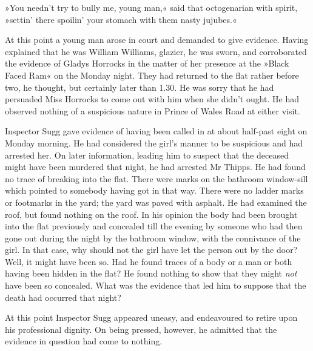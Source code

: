»You needn't try to bully me, young man,« said that octogenarian with spirit, »settin' there spoilin' your stomach with them nasty jujubes.«

At this point a young man arose in court and demanded to give evidence. Having explained that he was William Williams, glazier, he was sworn, and corroborated the evidence of Gladys Horrocks in the matter of her presence at the »Black Faced Ram« on the Monday night. They had returned to the flat rather before two, he thought, but certainly later than 1.30. He was sorry that he had persuaded Miss Horrocks to come out with him when she didn't ought. He had observed nothing of a suspicious nature in Prince of Wales Road at either visit.

Inspector Sugg gave evidence of having been called in at about half-past eight on Monday morning. He had considered the girl's manner to be suspicious and had arrested her. On later information, leading him to suspect that the deceased might have been murdered that night, he had arrested Mr Thipps. He had found no trace of breaking into the flat. There were marks on the bathroom window-sill which pointed to somebody having got in that way. There were no ladder marks or footmarks in the yard; the yard was paved with asphalt. He had examined the roof, but found nothing on the roof. In his opinion the body had been brought into the flat previously and concealed till the evening by someone who had then gone out during the night by the bathroom window, with the connivance of the girl. In that case, why should not the girl have let the person out by the door? Well, it might have been so. Had he found traces of a body or a man or both having been hidden in the flat? He found nothing to show that they might \textit{not} have been so concealed. What was the evidence that led him to suppose that the death had occurred that night?

At this point Inspector Sugg appeared uneasy, and endeavoured to retire upon his professional dignity. On being pressed, however, he admitted that the evidence in question had come to nothing.


